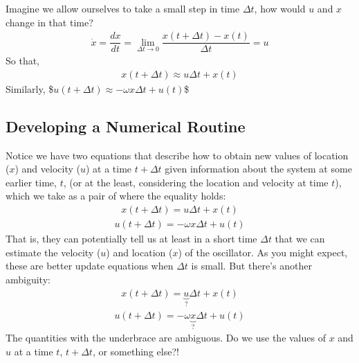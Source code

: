 \documentclass[letterpaper,10pt,english]{jupyterBook}
\begin{document}
\sphinxAtStartPar
Imagine we allow ourselves to take a small step in time \(\Delta t\), how would \(u\) and \(x\) change in that time?
\begin{equation*}
\begin{split}\dot{x} = \dfrac{dx}{dt} = \lim_{\Delta t \rightarrow 0} \dfrac{x(t+\Delta t) - x(t)}{\Delta t} = u\end{split}
\end{equation*}
\sphinxAtStartPar
So that,
\begin{equation*}
\begin{split}x(t+\Delta t) \approx u\Delta t + x(t)\end{split}
\end{equation*}
\sphinxAtStartPar
Similarly,
\$\(u(t+\Delta t) \approx -\omega x \Delta t + u(t)\)\$


\subsection{Developing a Numerical Routine}
\label{\detokenize{content/2_oscillations/activity-SHO-numerical:developing-a-numerical-routine}}
\sphinxAtStartPar
Notice we have two equations that describe how to obtain new values of location (\(x\)) and velocity (\(u\)) at a time \(t+\Delta t\) given information about the system at some earlier time, \(t\), (or at the least, considering the location and velocity at time \(t\)), which we take as a pair of  where the equality holds:
\begin{equation*}
\begin{split}x(t+\Delta t) = u\Delta t + x(t)\end{split}
\end{equation*}\begin{equation*}
\begin{split}u(t+\Delta t) = -\omega x \Delta t + u(t)\end{split}
\end{equation*}
\sphinxAtStartPar
That is, they can potentially tell us at least in a short time \(\Delta t\) that we can estimate the velocity (\(u\)) and location (\(x\)) of the oscillator.  As you might expect, these are better update equations when \(\Delta t\) is small. But there’s another ambiguity:
\begin{equation*}
\begin{split}x(t+\Delta t) = \underbrace{u}_{\mathtt{?}}\Delta t + x(t)\end{split}
\end{equation*}\begin{equation*}
\begin{split}u(t+\Delta t) = -\omega \underbrace{x}_{\mathtt{?}} \Delta t + u(t)\end{split}
\end{equation*}
\sphinxAtStartPar
The quantities with the underbrace are ambiguous. Do we use the values of \(x\) and \(u\) at a time \(t\), \(t+\Delta t\), or something else?!
\end{document}
